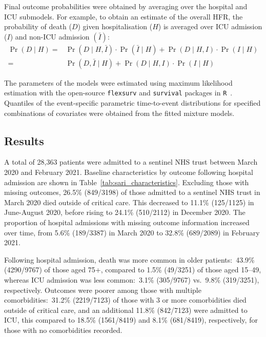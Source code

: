 Final outcome probabilities were obtained by averaging over the hospital and ICU submodels. For example, to obtain an estimate of the overall HFR, the probability of death ($D$) given hospitalisation ($H$) is averaged over ICU admission ($I$) and non-ICU admission $(\bar{I})$:
%
\begin{align*}
    \Pr(D \mid H)= & \Pr(D \mid H, \bar{I})\cdot\Pr(\bar{I} \mid H) + \Pr(D \mid H, I)\cdot\Pr(I \mid H) \\
    =              & \Pr(D, \bar{I} \mid H)+ \Pr(D \mid H, I)\cdot\Pr(I \mid H)
\end{align*}

The parameters of the models were estimated using maximum likelihood estimation with the open-source \texttt{flexsurv} and \texttt{survival} packages in \texttt{R}~\parencite{Jackson2016-tv, Therneau1999-to, R_Core_Team2020-ca}. Quantiles of the event-specific parametric time-to-event distributions for specified combinations of covariates were obtained from the fitted mixture models.
\newline

\subsection{Results}

A total of 28,363 patients were admitted to a sentinel NHS trust between March 2020 and February 2021. Baseline characteristics by outcome following hospital admission are shown in Table~\ref{tab:sari_characteristics}. Excluding those with missing outcomes, 26.5\% (849/3198) of those admitted to a sentinel NHS trust in March 2020 died outside of critical care. This decreased to 11.1\% (125/1125) in June-August 2020, before rising to 24.1\% (510/2112) in December 2020. The proportion of hospital admissions with missing outcome information increased over time, from 5.6\% (189/3387) in March 2020 to 32.8\% (689/2089) in February 2021.

Following hospital admission, death was more common in older patients:\ 43.9\% (4290/9767) of those aged 75+, compared to 1.5\% (49/3251) of those aged 15--49, whereas ICU admission was less common:\ 3.1\% (305/9767) vs.\ 9.8\% (319/3251), respectively. Outcomes were poorer among those with multiple comorbidities:\ 31.2\% (2219/7123) of those with 3 or more comorbidities died outside of critical care, and an additional 11.8\% (842/7123) were admitted to ICU, this compared to 18.5\% (1561/8419) and 8.1\% (681/8419), respectively, for those with no comorbidities recorded.

